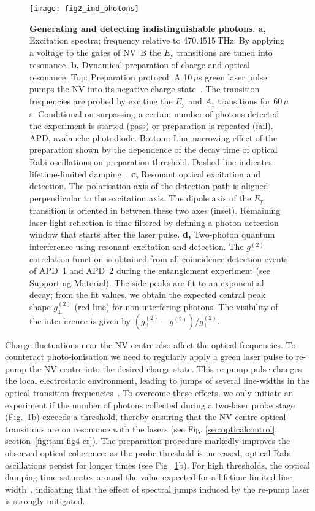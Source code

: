 \begin{figure}[tp]
	\centering
	\texttt{[image: fig2\_ind\_photons]}
	\caption{\label{fig:LDE-fig2} \textbf{Generating and detecting indistinguishable photons.}
	\textbf{a,} Excitation spectra; frequency relative to 470.4515$\,$THz. By applying a voltage to the gates of NV~B the $E_\text{y}$ transitions are tuned into resonance. 
	\textbf{b,} Dynamical preparation of charge and optical resonance. Top: Preparation protocol. A 10$\,\mu$s green laser pulse pumps the NV into its negative charge state~\cite{Robledo_Nature_2011}. The transition frequencies are probed by exciting the $E_\text{y}$ and $A_\text{1}$ transitions for 60$\,\mu$s. Conditional on surpassing a certain number of photons detected the experiment is started (pass) or preparation is repeated (fail). APD, avalanche photodiode. Bottom: Line-narrowing effect of the preparation shown by the dependence of the decay time of optical Rabi oscillations on preparation threshold. Dashed line indicates lifetime-limited damping~\cite{Robledo_Phys.Rev.Lett._2010}. 
	\textbf{c,} Resonant optical excitation and detection. The polarisation axis of the detection path is aligned perpendicular to the excitation axis. The dipole axis of the $E_\text{y}$ transition is oriented in between these two axes (inset). Remaining laser light reflection is time-filtered by defining a photon detection window that starts after the laser pulse. 
	\textbf{d,} Two-photon quantum interference using resonant excitation and detection. The $g^{(2)}$ correlation function is obtained from all coincidence detection events of APD~1 and APD~2 during the entanglement experiment (see Supporting Material). The side-peaks are fit to an exponential decay; from the fit values, we obtain the expected central peak shape $g_\perp^{(2)}$ (red line) for non-interfering photons. The visibility of the interference is given by $(g_\perp^{(2)}-g^{(2)})/g_\perp^{(2)}$.}
\end{figure}


Charge fluctuations near the NV centre also affect the optical frequencies. To counteract photo-ionisation we need to regularly apply a green laser pulse to re-pump the NV centre into the desired charge state. This re-pump pulse changes the local electrostatic environment, leading to jumps of several line-widths in the optical transition frequencies~\cite{Robledo_Phys.Rev.Lett._2010}. To overcome these effects, we only initiate an experiment if the number of photons collected during a two-laser probe stage (Fig.~\ref{fig:LDE-fig2}b) exceeds a threshold, thereby ensuring that the NV centre optical transitions are on resonance with the lasers (see Fig. \ref{sec:opticalcontrol}, section~\ref{fig:tam-fig4-cr}). The preparation procedure markedly improves the observed optical coherence: as the probe threshold is increased, optical Rabi oscillations persist for longer times (see Fig.~\ref{fig:LDE-fig2}b). For high thresholds, the optical damping time saturates around the value expected for a lifetime-limited line-width~\cite{Robledo_Phys.Rev.Lett._2010}, indicating that the effect of spectral jumps induced by the re-pump laser is strongly mitigated.

